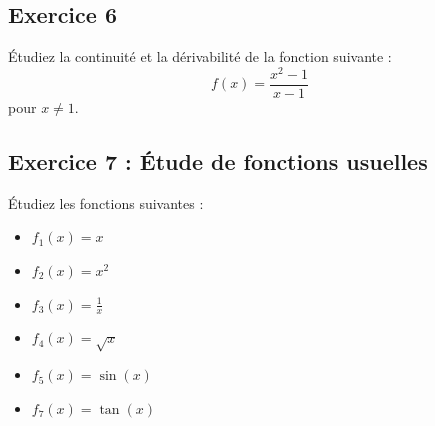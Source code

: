 \documentclass{article}
\begin{document}
	\subsection*{Exercice 6}
	Étudiez la continuité et la dérivabilité de la fonction suivante :
	\[
	f(x) = \frac{x^2 - 1}{x - 1}
	\]
	pour \( x \neq 1 \).
	
\subsection*{Exercice 7 : Étude de fonctions usuelles}
Étudiez les fonctions suivantes :
\begin{itemize}
	\item \( f_1(x) = x \)
	\item \( f_2(x) = x^2 \)
	\item \( f_3(x) = \frac{1}{x} \)
	\item \( f_4(x) = \sqrt{x} \)
	\item \( f_5(x) = \sin(x) \)
	\item \( f_7(x) = \tan(x) \)
\end{itemize}



	
	
	

	
	
	
	
	
	
	
	
\end{document}
